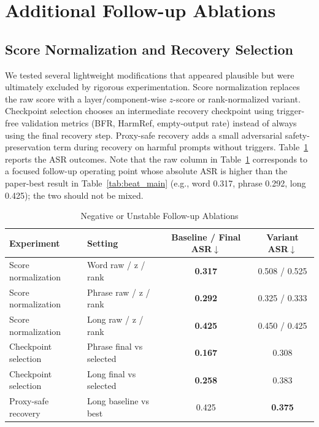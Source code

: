 \documentclass[lettersize,journal]{IEEEtran}
\begin{document}
\section{Additional Follow-up Ablations}
\label{app:followup_ablations}

\subsection{Score Normalization and Recovery Selection}
We tested several lightweight modifications that appeared plausible but were ultimately excluded by rigorous experimentation. Score normalization replaces the raw score with a layer/component-wise $z$-score or rank-normalized variant. Checkpoint selection chooses an intermediate recovery checkpoint using trigger-free validation metrics (BFR, HarmRef, empty-output rate) instead of always using the final recovery step. Proxy-safe recovery adds a small adversarial safety-preservation term during recovery on harmful prompts without triggers. Table~\ref{tab:negative_followups} reports the ASR outcomes. Note that the raw column in Table~\ref{tab:negative_followups} corresponds to a focused follow-up operating point whose absolute ASR is higher than the paper-best result in Table~\ref{tab:beat_main} (e.g., word 0.317, phrase 0.292, long 0.425); the two should not be mixed.

\begin{table}[!t]
\caption{Negative or Unstable Follow-up Ablations}
\label{tab:negative_followups}
\centering
\begin{tabular}{llcc}
\toprule
Experiment & Setting & Baseline / Final ASR$\downarrow$ & Variant ASR$\downarrow$ \\
\midrule
Score normalization & Word raw / z / rank & \textbf{0.317} & 0.508 / 0.525 \\
Score normalization & Phrase raw / z / rank & \textbf{0.292} & 0.325 / 0.333 \\
Score normalization & Long raw / z / rank & \textbf{0.425} & 0.450 / 0.425 \\
Checkpoint selection & Phrase final vs selected & \textbf{0.167} & 0.308 \\
Checkpoint selection & Long final vs selected & \textbf{0.258} & 0.383 \\
Proxy-safe recovery & Long baseline vs best & 0.425 & \textbf{0.375} \\
\bottomrule
\end{tabular}
\end{table}
\end{document}
